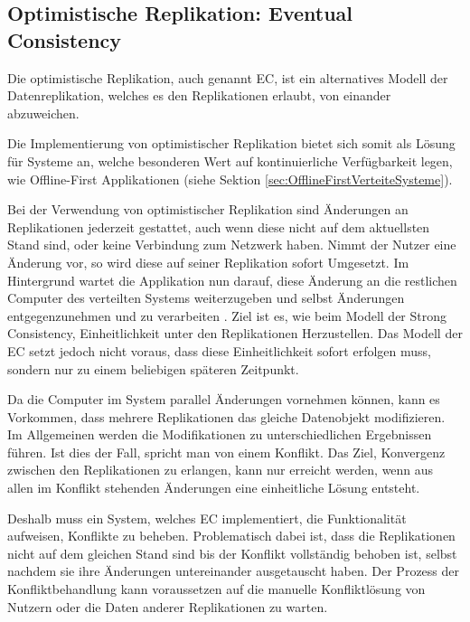 \documentclass[a4paper, 12pt]{scrreprt}
\begin{document}
\subsection{Optimistische Replikation: Eventual Consistency}

Die optimistische Replikation, auch genannt \acf{EC}, ist ein alternatives Modell der Datenreplikation, welches es den Replikationen erlaubt, von einander abzuweichen.

Die Implementierung von optimistischer Replikation bietet sich somit als Lösung für Systeme an, welche besonderen Wert auf kontinuierliche Verfügbarkeit legen, wie Offline-First Applikationen (siehe Sektion \ref{sec:OfflineFirstVerteiteSysteme}). 

Bei der Verwendung von optimistischer Replikation sind Änderungen an Replikationen jederzeit gestattet, auch wenn diese nicht auf dem aktuellsten Stand sind, oder keine Verbindung zum Netzwerk haben. Nimmt der Nutzer eine Änderung vor, so wird diese auf seiner Replikation sofort Umgesetzt. Im Hintergrund wartet die Applikation nun darauf, diese Änderung an die restlichen Computer des verteilten Systems weiterzugeben und selbst Änderungen entgegenzunehmen und zu verarbeiten \autocite[S.46]{ArticleOptimisticReplication}. Ziel ist es, wie beim Modell der Strong Consistency, Einheitlichkeit unter den Replikationen Herzustellen. Das Modell der \ac{EC} setzt jedoch nicht voraus, dass diese Einheitlichkeit sofort erfolgen muss, sondern nur zu einem beliebigen späteren Zeitpunkt. 

Da die Computer im System parallel Änderungen vornehmen können, kann es Vorkommen, dass mehrere Replikationen das gleiche Datenobjekt modifizieren. Im Allgemeinen werden die Modifikationen zu unterschiedlichen Ergebnissen führen. Ist dies der Fall, spricht man von einem Konflikt. Das Ziel, Konvergenz zwischen den Replikationen zu erlangen, kann nur erreicht werden, wenn aus allen im Konflikt stehenden Änderungen eine einheitliche Lösung entsteht.

Deshalb muss ein System, welches \ac{EC} implementiert, die Funktionalität aufweisen, Konflikte zu beheben. Problematisch dabei ist, dass die Replikationen nicht auf dem gleichen Stand sind bis der Konflikt vollständig behoben ist, selbst nachdem sie ihre Änderungen untereinander ausgetauscht haben. Der Prozess der Konfliktbehandlung kann voraussetzen auf die manuelle Konfliktlösung von Nutzern oder die Daten anderer Replikationen zu warten. \autocite{ArticleEventualConsistencyConflicts}
\end{document}
